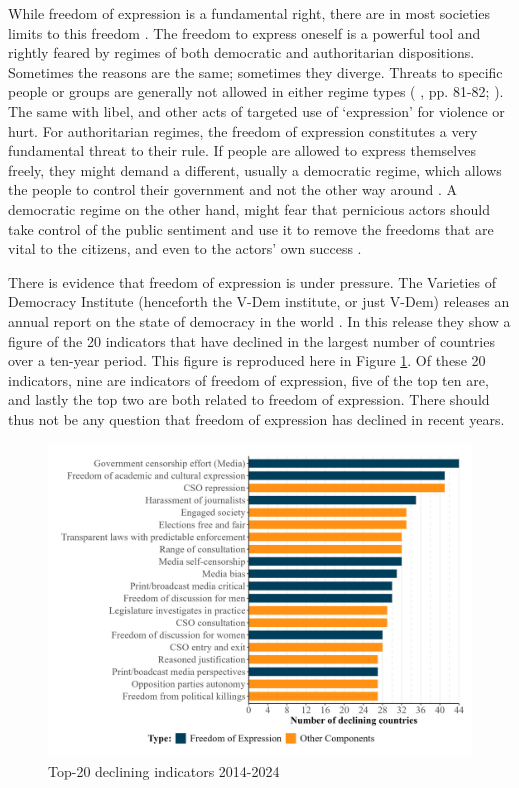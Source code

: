 While freedom of expression is a fundamental right, there are in most societies limits to this freedom \citep{bonotti_freedom_2021}. The freedom to express oneself is a powerful tool and rightly feared by regimes of both democratic and authoritarian dispositions. Sometimes the reasons are the same; sometimes they diverge. Threats to specific people or groups are generally not allowed in either regime types (\citeauthor{mill_liberty_2010} \citeyear{mill_liberty_2010}, pp. 81-82; \citeauthor{bonotti_freedom_2021} \citeyear{bonotti_freedom_2021}). The same with libel, and other acts of targeted use of `expression' for violence or hurt. For authoritarian regimes, the freedom of expression constitutes a very fundamental threat to their rule. If people are allowed to express themselves freely, they might demand a different, usually a democratic regime, which allows the people to control their government and not the other way around \citep[p. 85-86]{bhagwat_freedom_2021}. A democratic regime on the other hand, might fear that pernicious actors should take control of the public sentiment and use it to remove the freedoms that are vital to the citizens, and even to the actors' own success \citep[p. 103]{bhagwat_freedom_2021}.

There is evidence that freedom of expression is under pressure. The Varieties of Democracy Institute (henceforth the V-Dem institute, or just V-Dem) releases an annual report on the state of democracy in the world \citep[p. 17]{nord_democracy_2025}. In this release they show a figure of the 20 indicators that have declined in the largest number of countries over a ten-year period. This figure is reproduced here in Figure \ref{fig:declining}. Of these 20 indicators, nine are indicators of freedom of expression, five of the top ten are, and lastly the top two are both related to freedom of expression. There should thus not be any question that freedom of expression has declined in recent years.

\begin{figure}[hbt!]
    \centering
    \includegraphics[width=\linewidth]{graphics/declining_indicators.jpeg}
    \caption{Top-20 declining indicators 2014-2024 \citep[p. 17]{nord_democracy_2025}}
    \label{fig:declining}
\end{figure}

